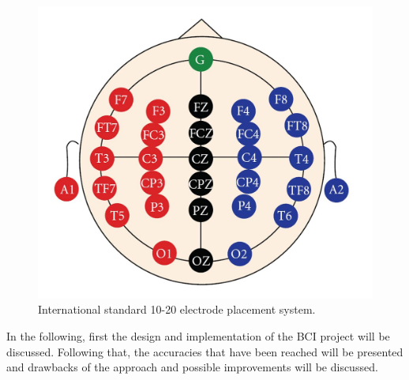 \documentclass[a4paper,oneside, openright,12pt]{report}
\begin{document}
\begin{figure}[h]
	\centering
	\includegraphics[width=0.5\linewidth]{./gfx/10-20.jpg}
	\caption{International standard 10-20 electrode placement system.}
	\label{fig:10-20-system}
\end{figure}



In the following, first the design and implementation of the BCI project will be discussed. Following that, the accuracies that have been reached will be presented and drawbacks of the approach and possible improvements will be discussed.







\end{document}
